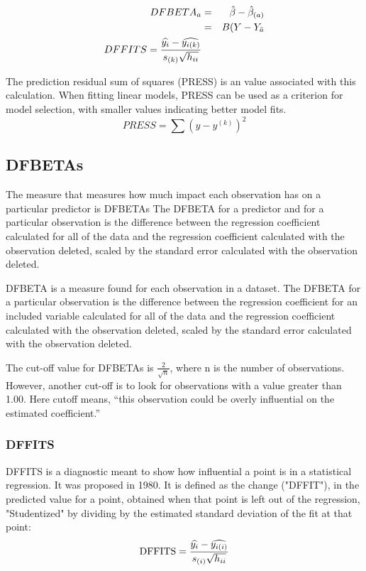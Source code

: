 \documentclass[Main.tex]{subfiles}
\begin{document}
\begin{eqnarray}
DFBETA_{a} &=& \hat{\beta} - \hat{\beta}_{(a)} \\
&=& B(Y-Y_{\bar{a}}
\\ DFFITS = {\widehat{y_i} -
	\widehat{y_{i(k)}} \over s_{(k)} \sqrt{h_{ii}}} 
\end{eqnarray}

The prediction residual sum of squares (PRESS) is an value associated with this calculation. When fitting linear models, PRESS can be used as a criterion for model selection, with smaller values indicating better model fits.
\begin{displaymath}
PRESS = \sum(y-y^{(k)})^2
\end{displaymath}
%	
%	
\subsection{DFBETAs}
The measure that measures how much impact each observation has on a particular predictor is DFBETAs The DFBETA for a predictor and for a particular observation is the difference between the regression coefficient calculated for all of the data and the regression coefficient calculated with the observation deleted, scaled by the standard error calculated with the observation deleted.

DFBETA is a measure found for each observation in a dataset. The DFBETA for a 
particular observation is the difference between the regression coefficient for an included variable calculated for all of the data and the regression coefficient calculated with the observation deleted, scaled by the standard error calculated with the 
observation deleted. 

The cut-off value for DFBETAs is $\frac{2}{\sqrt{n}}$, where n is the number of observations. 
However, another cut-off is to look for observations with a value greater than 1.00. Here cutoff means, 
“this observation could be overly influential on the estimated coefficient.” 
\subsubsection{DFFITS}
DFFITS is a diagnostic meant to show how influential a point is in a statistical regression. It was proposed in 1980. It is defined as the change ("DFFIT"), in the predicted value for a point, obtained when that point is left out of the regression, "Studentized" by dividing by the estimated standard deviation of the fit at that point:
\[ \mbox{DFFITS} = {\widehat{y_i} - \widehat{y_{i(i)}} \over s_{(i)} \sqrt{h_{ii}}}\]
\end{document}
